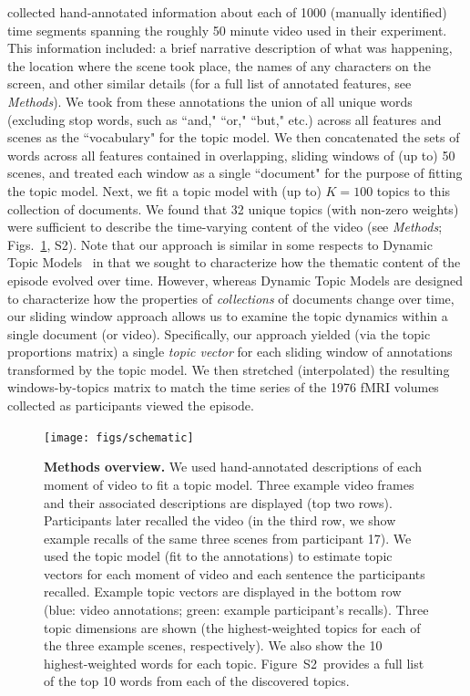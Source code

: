 \documentclass{article}
\newcommand{\topics}{S2}
\begin{document}
\cite{ChenEtal17} collected hand-annotated information about each of 1000 (manually identified) time segments spanning the roughly 50 minute video used in their experiment.  This information included: a brief narrative description of what was happening, the location where the scene took place, the names of any characters on the screen, and other similar details (for a full list of annotated features, see \textit{Methods}).  We took from these annotations the union of all unique words (excluding stop words, such as ``and," ``or," ``but," etc.) across all features and scenes as the ``vocabulary" for the topic model.  We then concatenated the sets of words across all features contained in overlapping, sliding windows of (up to) 50 scenes, and treated each window as a single ``document" for the purpose of fitting the topic model.  Next, we fit a topic model with (up to) $K = 100$ topics to this collection of documents.  We found that 32 unique topics (with non-zero weights) were sufficient to describe the time-varying content of the video (see \textit{Methods}; Figs.~\ref{fig:schematic}, \topics).  Note that our approach is similar in some respects to Dynamic Topic Models~\citep{BleiLaff06} in that we sought to characterize how the thematic content of the episode evolved over time.  However, whereas Dynamic Topic Models are designed to characterize how the properties of \textit{collections} of documents change over time, our sliding window approach allows us to examine the topic dynamics within a single document (or video).  Specifically, our approach yielded (via the topic proportions matrix) a single \textit{topic vector} for each sliding window of annotations transformed by the topic model.  We then stretched (interpolated) the resulting windows-by-topics matrix to match the time series of the 1976 fMRI volumes collected as participants viewed the episode.

\begin{figure}[tp]
\centering
\texttt{[image: figs/schematic]}
\caption{\small \textbf{Methods overview.} We used hand-annotated descriptions of each moment of video to fit a topic model.  Three example video frames and their associated descriptions are displayed (top two rows).  Participants later recalled the video (in the third row, we show example recalls of the same three scenes from participant 17).  We used the topic model (fit to the annotations) to estimate topic vectors for each moment of video and each sentence the participants recalled.  Example topic vectors are displayed in the bottom row (blue: video annotations; green: example participant's recalls).  Three topic dimensions are shown (the highest-weighted topics for each of the three example scenes, respectively).  We also show the 10 highest-weighted words for each topic.  Figure~\topics~provides a full list of the top 10 words from each of the discovered topics.}
\label{fig:schematic}
\end{figure}
\end{document}
